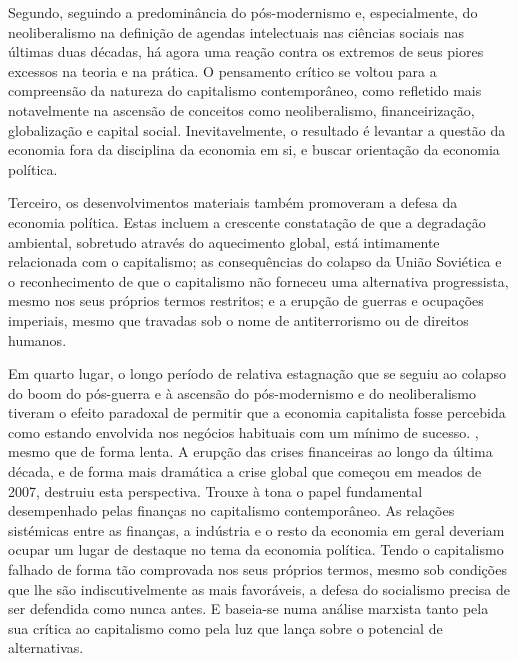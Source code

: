  \par 
Segundo, seguindo a predominância do pós-modernismo e, especialmente, do neoliberalismo na definição de agendas intelectuais nas ciências sociais nas últimas duas décadas, há agora uma reação contra os extremos de seus piores excessos na teoria e na prática. O pensamento crítico se voltou para a compreensão da natureza do capitalismo contemporâneo, como refletido mais notavelmente na ascensão de conceitos como neoliberalismo, financeirização, globalização e capital social. Inevitavelmente, o resultado é levantar a questão da economia fora da disciplina da economia em si, e buscar orientação da economia política.
 \par 
Terceiro, os desenvolvimentos materiais também promoveram a defesa da economia política. Estas incluem a crescente constatação de que a degradação ambiental, sobretudo através do aquecimento global, está intimamente relacionada com o capitalismo; as consequências do colapso da União Soviética e o reconhecimento de que o capitalismo não forneceu uma alternativa progressista, mesmo nos seus próprios termos restritos; e a erupção de guerras e ocupações imperiais, mesmo que travadas sob o nome de antiterrorismo ou de direitos humanos.
 \par 
Em quarto lugar, o longo período de relativa estagnação que se seguiu ao colapso do boom do pós-guerra e à ascensão do pós-modernismo e do neoliberalismo tiveram o efeito paradoxal de permitir que a economia capitalista fosse percebida como estando envolvida nos negócios habituais com um mínimo de sucesso. , mesmo que de forma lenta. A erupção das crises financeiras ao longo da última década, e de forma mais dramática a crise global que começou em meados de 2007, destruiu esta perspectiva. Trouxe à tona o papel fundamental desempenhado pelas finanças no capitalismo contemporâneo. As relações sistémicas entre as finanças, a indústria e o resto da economia em geral deveriam ocupar um lugar de destaque no tema da economia política. Tendo o capitalismo falhado de forma tão comprovada nos seus próprios termos, mesmo sob condições que lhe são indiscutivelmente as mais favoráveis, a defesa do socialismo precisa de ser defendida como nunca antes. E baseia-se numa análise marxista tanto pela sua crítica ao capitalismo como pela luz que lança sobre o potencial de alternativas.
 \par 
